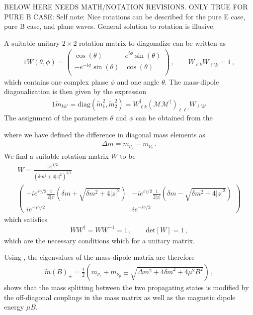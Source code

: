 BELOW HERE NEEDS MATH/NOTATION REVISIONS. ONLY TRUE FOR PURE B CASE: Self note: Nice rotations can be described for the pure E case, pure B case, and plane waves. General solution to rotation is illusive.

A suitable unitary $2\times2$ rotation matrix to diagonalize  can be written as
\begin{alignat}{1}
	\label{mix:4} W(\theta,\phi) = 
    \left(
    \begin{array}{cc}
         \cos (\theta ) & e^{i \phi } \sin (\theta ) \\
         -e^{-i \phi } \sin (\theta ) & \cos (\theta ) \\
    \end{array}
    \right)\,,\qquad
    W_{\ell k}W^{\dag}_{\ell' k} = 1\,,
\end{alignat}
which contains one complex phase $\phi$ and one angle $\theta$. The mass-dipole diagonalization is then given by the expression
\begin{alignat}{1}
	\label{mix:5} \widetilde{m}_{kk'} = \mathrm{diag}(\widetilde{m}_{1}^{2},\widetilde{m}_{2}^{2})=W_{\ell k}^{\dag}\left(\mathcal{M}\mathcal{M}^{\dag}\right)_{\ell\ell'}W_{\ell'k'}
\end{alignat}
The assignment of the parameters $\theta$ and $\phi$ can be obtained from the

where we have defined the difference in diagonal mass elements as
\begin{align}
    \Delta m = m_{\nu_{\mu}} - m_{\nu_{e}}\,.
\end{align}
We find a suitable rotation matrix $W$ to be
\begin{multline}
    \label{w:1}
    W=\frac{|z|^{1/2}}{\left(\delta m^{2} + 4|z|^{2}\right)^{1/4}}\\
    \begin{pmatrix}
        -ie^{i\gamma/2}\frac{1}{2|z|}\left(\delta m + \sqrt{\delta m^{2} + 4|z|^{2}}\right) & -ie^{i\gamma/2}\frac{1}{2|z|}\left(\delta m - \sqrt{\delta m^{2} + 4|z|^{2}}\right)\\
        ie^{-i\gamma/2} & ie^{-i\gamma/2}        
    \end{pmatrix}
\end{multline}
which satisfies
\begin{align}
    WW^{\dag}=WW^{-1}=1\,,\qquad \mathrm{det}[W]=1\,,
\end{align}
which are the necessary conditions which for a unitary matrix.

Using , the eigenvalues of the mass-dipole matrix are therefore
\begin{align}
    \label{eigenvalue:1}
    \widetilde{m}(B)_{\pm}=\frac{1}{2}\left(m_{\nu_{e}}+m_{\nu_{\mu}}\pm\sqrt{\Delta m^{2}+4{\delta m}^{2}+4\mu^{2}B^{2}}\right)\,,
\end{align}
 shows that the mass splitting between the two propagating states is modified by the off-diagonal couplings in the mass matrix as well as the magnetic dipole energy $\mu B$.

